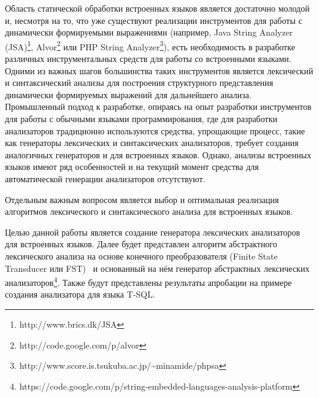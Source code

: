 Область статической обработки встроенных языков является достаточно молодой и, 
несмотря на то, что уже существуют реализации инструментов для работы с 
динамически формируемыми выражениями  (например, Java String Analyzer (JSA)\footnote{http://www.brics.dk/JSA}, 
Alvor\footnote{http://code.google.com/p/alvor} или PHP String Analyzer\footnote{http://www.score.is.tsukuba.ac.jp/\textasciitilde minamide/phpsa}), есть необходимость в разработке 
различных инструментальных средств для работы со встроенными языками. Одними из 
важных шагов большинства таких инструментов является  лексический и 
синтаксический анализы для построения структурного представления динамически 
формируемых выражений для дальнейшего анализа. Промышленный подход к разработке, 
опираясь на опыт разработки инструментов для работы с обычными языками 
программирования, где для разработки анализаторов традиционно используются 
средства, упрощающие процесс, такие как генераторы лексических и синтаксических 
анализаторов, требует создания аналогичных генераторов и для встроенных языков. 
Однако, анализы встроенных языков имеют ряд особенностей и на текущий момент 
средства для автоматической генерации анализаторов отсутствуют.

Отдельным важным вопросом является выбор и оптимальная реализация алгоритмов 
лексического и синтаксического анализа для встроенных языков.

Целью данной работы является создание генератора лексических анализаторов для 
встроенных языков. Далее будет представлен алгоритм абстрактного лексического 
анализа на основе конечного преобразователя (Finite State Transducer или 
FST)~\cite{FST} и основанный на нём генератор абстрактных лексических анализаторов\footnote{https://code.google.com/p/string-embedded-languages-analysis-platform}. 
Также будут представлены результаты апробации на примере создания анализатора для 
языка T-SQL. 





